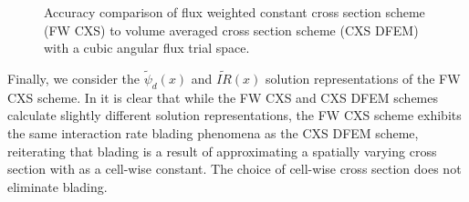 \begin{figure}[!htp]
\begin{center}
{}
\end{center}
\caption{Accuracy comparison of flux weighted constant cross section scheme (FW CXS) to volume averaged cross section  scheme (CXS DFEM) with a cubic angular flux trial space.}
\label{fig:fw_accuracy}
\end{figure}
Finally, we consider the $\widetilde{\psi}_d(x)$ and $\widetilde{IR}(x)$ solution representations of the FW CXS scheme.  
In  it is clear that while the FW CXS and CXS DFEM schemes calculate slightly different solution representations, the FW CXS scheme  exhibits the same interaction rate blading phenomena as the CXS DFEM scheme, reiterating that blading is a result of approximating a spatially varying cross section with as a cell-wise constant.
The choice of cell-wise cross section does not eliminate blading.
